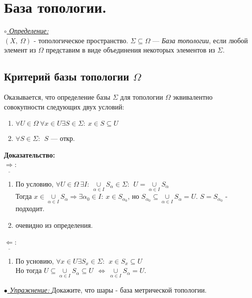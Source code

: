 \section{База топологии.}
\underline{\textit{$\circ$ Определение:}}\\
$(X,~\Omega)$ - топологическое пространство.
$\Sigma\subseteq\Omega$ --- \emph{База топологии}, если любой элемент из $\Omega$ представим в виде объединения некоторых элементов из $\Sigma$.
\subsection{Критерий базы топологии $\Omega$}
Оказывается, что определение базы $\Sigma$ для топологии $\Omega$ эквивалентно совокупности следующих двух условий:
\begin{enumerate}
\item $\forall U\in\Omega~\forall x\in U \exists S\in \Sigma:~x\in S\subseteq U$
\item $\forall S\in \Sigma:~~ S$ --- откр.
\end{enumerate}
\textbf{Доказательство:}\\
$\underline{\Rightarrow}$: 
\begin{enumerate}
\item По условию, $\forall U\in \Omega~\exists I:~\underset{\alpha\in I}{\cup}S_{\alpha}\in \Sigma:~~U=\underset{\alpha\in I}{\cup}S_{\alpha}$
\\ Тогда $x\in \underset{\alpha\in I}{\cup}S_{\alpha}\Longrightarrow \exists\alpha_{0}\in I:~x\in S_{\alpha_{0}}$, но $S_{\alpha_{0}}\subseteq\underset{\alpha\in I}{\cup}S_{\alpha}=U$. $S = S_{\alpha_{0}}$ - подходит.
\item очевидно из определения.
\end{enumerate}
$\underline{\Leftarrow}$: \begin{enumerate}
\item[]По усновию, $\forall x\in U \exists S_{x}\in\Sigma:~~x\in S_{x}\subseteq U$
\\Но тогда $U\subseteq\underset{\alpha\in I}{\cup}S_{\alpha}\subseteq U~~\Longleftrightarrow~\underset{\alpha\in I}{\cup}S_{\alpha}=U$.
\end{enumerate}
 \underline{\emph{$\bullet$ Упражнение: }} Докажите, что шары - база метрической топологии.
